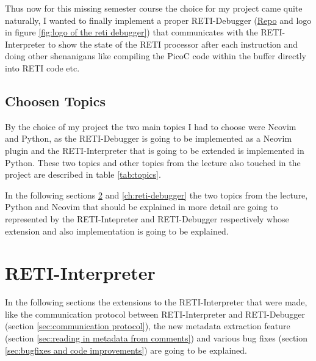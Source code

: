 \documentclass{report}
\begin{document}
Thus now for this missing semester course the choice for my project came quite naturally, I wanted to finally implement a proper \alert{RETI-Debugger} (\href{https://github.com/matthejue/RETI-Debugger}{Repo} and logo in figure \ref{fig:logo of the reti debugger}) that communicates with the RETI-Interpreter to show the state of the RETI processor after each instruction and doing other shenanigans like compiling the PicoC code within the buffer directly into RETI code etc.

\section{Choosen Topics}
\label{sec:choosen_topics}

By the choice of my project the two main topics I had to choose were \alert{Neovim} and \alert{Python}, as the \alert{RETI-Debugger} is going to be implemented as a Neovim plugin and the \alert{RETI-Interpreter} that is going to be extended is implemented in Python. These two topics and other topics from the lecture also touched in the project are described in table \ref{tab:topics}.

In the following sections \ref{ch:reti-interpreter} and \ref{ch:reti-debugger} the two topics from the lecture, Python and Neovim that should be explained in more detail are going to represented by the RETI-Intepreter and RETI-Debugger respectively whose extension and also implementation is going to be explained.



\vspace{0.5cm}
\chapter{RETI-Interpreter}
\label{ch:reti-interpreter}

In the following sections the extensions to the RETI-Interpreter that were made, like the communication protocol between RETI-Interpreter and RETI-Debugger (section \ref{sec:communication protocol}), the new metadata extraction feature (section \ref{sec:reading in metadata from comments}) and various bug fixes (section \ref{sec:bugfixes and code improvements}) are going to be explained.
\end{document}
